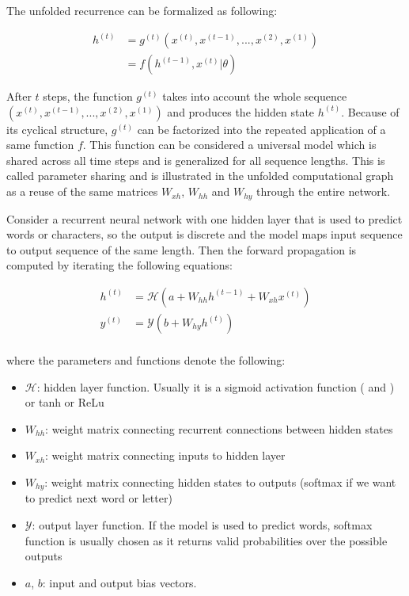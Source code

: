 \documentclass[]{krantz}
\providecommand{\tightlist}{%
  \setlength{\itemsep}{0pt}\setlength{\parskip}{0pt}}
\begin{document}
The unfolded recurrence can be formalized as following:

\begin{align}
h^{(t)} & = g^{(t)}(x^{(t)},x^{(t-1)},...,x^{(2)}, x^{(1)}) \\
& = f(h^{(t-1)},x^{(t)}| \theta)  \label{eq:recurrent}
\end{align}

After \(t\) steps, the function \(g^{(t)}\) takes into account the whole sequence \((x^{(t)},x^{(t-1)},...,x^{(2)}, x^{(1)})\) and produces the hidden state \(h^{(t)}\). Because of its cyclical structure, \(g^{(t)}\) can be factorized into the repeated application of a same function \(f\). This function can be considered a universal model which is shared across all time steps and is generalized for all sequence lengths. This is called parameter sharing and is illustrated in the unfolded computational graph as a reuse of the same matrices \(W_{xh}\), \(W_{hh}\) and \(W_{hy}\) through the entire network. \citep{goodfellow2016deep}

Consider a recurrent neural network with one hidden layer that is used to predict words or characters, so the output is discrete and the model maps input sequence to output sequence of the same length. Then the forward propagation is computed by iterating the following equations:

\begin{align}
h^{(t)} & = \mathcal{H}(a+W_{hh}h^{(t-1)}+W_{xh}x^{(t)}) \label{eq:input-to-hidden} \\
y^{(t)} & = \mathcal{Y}(b+W_{hy}h^{(t)}) \label{eq:hidden-to-output} \\
\end{align}

where the parameters and functions denote the following:

\begin{itemize}
\tightlist
\item
  \(\mathcal{H}\): hidden layer function. Usually it is a sigmoid activation function ( \citet{sutskever2014sequence} and \citet{mikolov2010recurrent}) or tanh or ReLu
\item
  \(W_{hh}\): weight matrix connecting recurrent connections between hidden states
\item
  \(W_{xh}\): weight matrix connecting inputs to hidden layer
\item
  \(W_{hy}\): weight matrix connecting hidden states to outputs (softmax if we want to predict next word or letter)
\item
  \(\mathcal{Y}\): output layer function. If the model is used to predict words, softmax function is usually chosen as it returns valid probabilities over the possible outputs \citep{mikolov2010recurrent}
\item
  \(a\), \(b\): input and output bias vectors.
\end{itemize}
\end{document}
